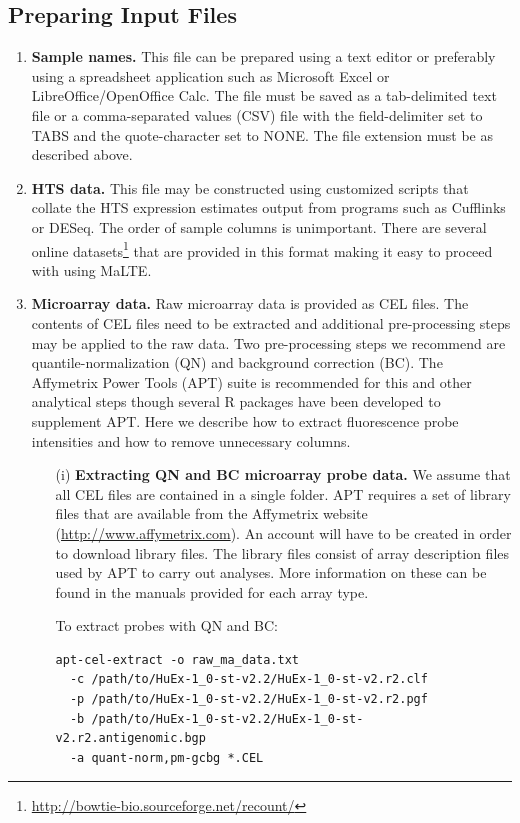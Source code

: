 \documentclass[a4paper,12pt]{article}
\begin{document}
\subsection{Preparing Input Files}
\label{gep:prepare}
\begin{enumerate}
\item \textbf{Sample names.} This file can be prepared using a text editor or preferably using a spreadsheet application such as Microsoft Excel or LibreOffice/OpenOffice Calc. The file must be saved as a tab-delimited text file or a comma-separated values (CSV) file with the field-delimiter set to TABS and the quote-character set to NONE. The file extension must be as described above.

\item \textbf{HTS data.} This file may be constructed using customized scripts that collate the HTS expression estimates output from programs such as \textsf{Cufflinks} or \textsf{DESeq}. The order of sample columns is unimportant. There are several online datasets\footnote{\url{http://bowtie-bio.sourceforge.net/recount/}} that are provided in this format making it easy to proceed with using \textsf{MaLTE}.

\item \textbf{Microarray data.} Raw microarray data is provided as CEL files. The contents of CEL files need to be extracted and additional pre-processing steps may be applied to the raw data. Two pre-processing steps we recommend are quantile-normalization (QN) and background correction (BC). The Affymetrix Power Tools (APT) suite is recommended for this and other analytical steps though several \textsf{R} packages have been developed to supplement APT.  Here we describe how to extract fluorescence probe intensities and how to remove unnecessary columns.

\begin{enumerate}
\item[(i)] \textbf{Extracting QN and BC microarray probe data.} We assume that all CEL files are contained in a single folder. APT requires a set of library files that are available from the Affymetrix website (\url{http://www.affymetrix.com}). An account will have to be created in order to download library files. The library files consist of array description files used by APT to carry out analyses. More information on these can be found in the manuals provided for each array type. 

To extract probes with QN and BC:
\begin{verbatim}
apt-cel-extract -o raw_ma_data.txt 
  -c /path/to/HuEx-1_0-st-v2.2/HuEx-1_0-st-v2.r2.clf 
  -p /path/to/HuEx-1_0-st-v2.2/HuEx-1_0-st-v2.r2.pgf 
  -b /path/to/HuEx-1_0-st-v2.2/HuEx-1_0-st-v2.r2.antigenomic.bgp 
  -a quant-norm,pm-gcbg *.CEL
\end{verbatim}


\end{enumerate}
\end{enumerate}
\end{document}

